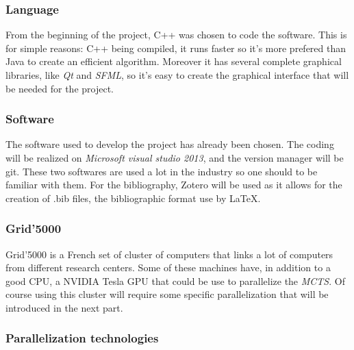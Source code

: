\label{last part}
\subsubsection{Language}

From the beginning of the project, C++ was chosen to code the software. This is for simple reasons: C++ being compiled, it runs faster so it's more prefered than Java to create an efficient algorithm.  Moreover it has several complete graphical libraries, like \emph{Qt} and \emph{SFML}, so it's easy to create the graphical interface that will be needed for the project.

\subsubsection{Software}

The software used to develop the project has already been chosen. The coding will be realized on \emph{Microsoft visual studio 2013}, and the version manager will be git. These two softwares are used a lot in the industry so one should to be familiar with them.
For the bibliography, Zotero will be used as it allows for the creation of .bib files, the bibliographic format use by LaTeX.

\subsubsection{Grid'5000}

Grid'5000 is a French set of cluster of computers that links a lot of computers from different research centers. Some of these machines have, in addition to a good CPU, a NVIDIA Tesla GPU that could be use to parallelize the \emph{MCTS}. Of course using this cluster will require some specific parallelization that will be introduced in the next part.

\subsubsection{Parallelization technologies}

